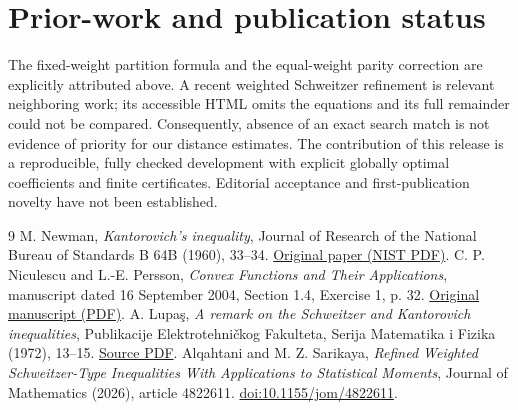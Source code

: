 \documentclass[11pt]{article}
\begin{document}
\section{Prior-work and publication status}
The fixed-weight partition formula and the equal-weight parity correction
are explicitly attributed above. A recent weighted Schweitzer refinement
\cite{alqahtani} is relevant neighboring work; its accessible HTML omits
the equations and its full remainder could not be compared. Consequently,
absence of an exact search match is not evidence of priority for our
distance estimates. The contribution of this release is a reproducible,
fully checked development with explicit globally optimal coefficients and finite
certificates. Editorial acceptance and first-publication novelty have not
been established.

\begingroup\small\raggedright
\begin{thebibliography}{9}
 M. Newman, \emph{Kantorovich's inequality},
Journal of Research of the National Bureau of Standards B 64B (1960),
33--34. \href{https://nvlpubs.nist.gov/nistpubs/jres/64B/jresv64Bn1p33_A1b.pdf}{Original paper (NIST PDF)}.
 C. P. Niculescu and L.-E. Persson,
\emph{Convex Functions and Their Applications}, manuscript dated
16 September 2004, Section 1.4, Exercise 1, p. 32.
\href{https://carmamaths.org/resources/jon/Preprints/Books/CUP/CUPold/np-convex.pdf}{Original manuscript (PDF)}.
 A. Lupa\c{s}, \emph{A remark on the Schweitzer and
Kantorovich inequalities}, Publikacije Elektrotehni\v{c}kog Fakulteta,
Serija Matematika i Fizika (1972), 13--15.
\href{https://ictp.acad.ro/wp-content/uploads/2025/11/1972-Lupas-Publikacije-A-remark-on-the-Schweitzer-and-Kantorovich-inequalities.pdf}{Source PDF}.
 Alqahtani and M. Z. Sarikaya,
\emph{Refined Weighted Schweitzer-Type Inequalities With Applications
to Statistical Moments}, Journal of Mathematics (2026), article 4822611.
\href{https://doi.org/10.1155/jom/4822611}{doi:10.1155/jom/4822611}.
\end{thebibliography}
\endgroup
\end{document}
